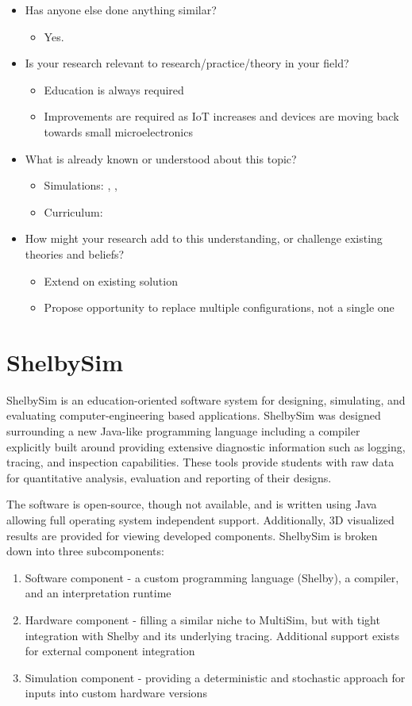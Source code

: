 \begin{itemize}
\item Has anyone else done anything similar?
\begin{itemize}
\item Yes. 
\end{itemize}
\item Is your research relevant to research/practice/theory in your field?
\begin{itemize}
\item Education is always required
\item Improvements are required as IoT increases and devices are moving back towards small
	microelectronics
\end{itemize}
\item What is already known or understood about this topic?
\begin{itemize}
\item Simulations: \cite{Tappan2009}, \cite{Skrien2001}, \cite{Skillen2011}
\item Curriculum: 
\end{itemize}
\item How might your research add to this understanding, or challenge existing theories and beliefs?
\begin{itemize}
\item Extend on existing solution
\item Propose opportunity to replace multiple configurations, not a single one
\end{itemize}
\end{itemize}

\section{ShelbySim \cite{Tappan2009}}

ShelbySim is an education-oriented software system for designing, simulating, and evaluating computer-engineering based applications. ShelbySim was designed surrounding a new Java-like programming language including a compiler explicitly built around providing extensive diagnostic information such as logging, tracing, and inspection capabilities. These tools provide students with raw data for quantitative analysis, evaluation and reporting of their designs. 

The software is open-source, though not available, and is written using Java allowing full operating system independent support. Additionally, 3D visualized results are provided for viewing developed components. ShelbySim is broken down into three subcomponents:
\begin{enumerate}
\item Software component - a custom programming language (Shelby), a compiler, and an interpretation runtime
\item Hardware component - filling a similar niche to MultiSim, but with tight integration with Shelby and its underlying tracing. Additional support exists for external component integration
\item Simulation component - providing a deterministic and stochastic approach for inputs into custom hardware versions
\end{enumerate} 


